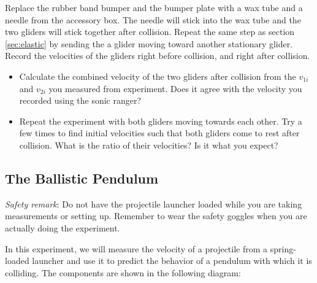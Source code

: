 Replace the rubber band bumper and the bumper plate with a wax tube and a needle from the accessory box. The needle will stick into the wax tube and the two gliders will stick together after collision. Repeat the same step as section \ref{sec:elastic} by sending the a glider moving toward another stationary glider. Record the velocities of the gliders right before collision, and right after collision.
\begin{itemize}
    \item Calculate the combined velocity of the two gliders after collision from the $v_{1i}$ and $v_{2i}$ you measured from experiment. Does it agree with the velocity you recorded using the sonic ranger?
    \item Repeat the experiment with both gliders moving towards each other. Try a few times to find initial velocities such that both gliders come to rest after collision. What is the ratio of their velocities? Is it what you expect?
\end{itemize}



\subsection{The Ballistic Pendulum}
\emph{Safety remark}: Do not have the projectile launcher loaded while you are taking measurements or setting up. Remember to wear the safety goggles when you are actually doing the experiment.\myskip

In this experiment, we will measure the velocity of a projectile from a spring-loaded launcher and use it to predict the behavior of a pendulum with which it is colliding. The components are shown in the following diagram:

